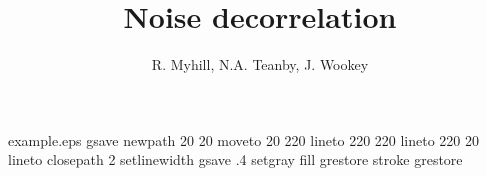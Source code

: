 %
%
%
%
%
\begin{filecontents*}{example.eps}
gsave
newpath
  20 20 moveto
  20 220 lineto
  220 220 lineto
  220 20 lineto
closepath
2 setlinewidth
gsave
  .4 setgray fill
grestore
stroke
grestore
\end{filecontents*}
%
\RequirePackage{fix-cm}
%
\documentclass[smallextended]{svjour3}       %
%
\smartqed  %
%
\usepackage{graphicx}
%
%
\usepackage{natbib}
\usepackage[T1]{fontenc}
%
%
%

\usepackage{amsmath}    
\usepackage{color}


\title{Noise decorrelation}


\author{R. Myhill, N.A. Teanby, J. Wookey}



